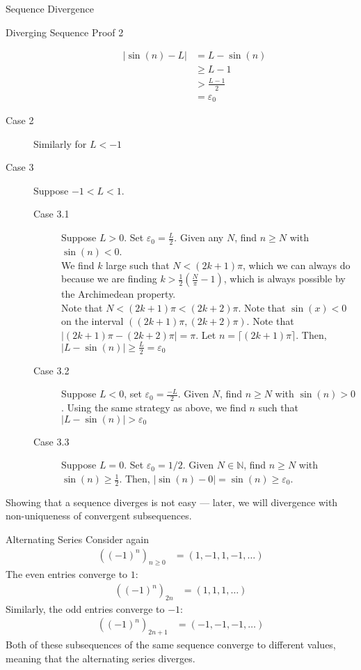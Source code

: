 \documentclass[8pt]{extarticle}
\newcommand{\N}{\mathbb{N}}
\begin{document}
\begin{problem}{Sequence Divergence}
\begin{problem}{Diverging Sequence Proof 2}
\begin{description}
          \begin{align*}
            |\sin(n)-L| &= L-\sin(n)\\
                        &\geq L-1\\
                        &> \frac{L-1}{2}\\
                        &= \varepsilon_0
          \end{align*}
        \item[Case 2] Similarly for $L < -1$
        \item[Case 3] Suppose $-1 < L < 1$.
          \begin{description}
            \item[Case 3.1] Suppose $L > 0$. Set $\varepsilon_0 = \frac{L}{2}$. Given any $N$, find $n \geq N$ with $\sin(n) < 0$. \\

              We find $k$ large such that $N < (2k+1)\pi$, which we can always do because we are finding $k > \frac{1}{2}\left(\frac{N}{\pi} - 1\right)$, which is always possible by the Archimedean property.\\

              Note that $N < (2k+1)\pi < (2k+2)\pi$. Note that $\sin(x) < 0$ on the interval $((2k+1)\pi,(2k+2)\pi)$. Note that $|(2k+1)\pi - (2k+2)\pi| = \pi$. Let $n = \lceil (2k+1)\pi\rceil$. Then, $|L-\sin(n)| \geq \frac{L}{2} = \varepsilon_0$
            \item[Case 3.2] Suppose $L < 0$, set $\varepsilon_0 = \frac{-L}{2}$. Given $N$, find $n \geq N$ with $\sin(n) > 0$. Using the same strategy as above, we find $n$ such that $|L - \sin(n)| > \varepsilon_0$
            \item[Case 3.3] Suppose $L = 0$. Set $\varepsilon_0 = 1/2$. Given $N\in\N$, find $n\geq N$ with $\sin(n) \geq \frac{1}{2}$. Then, $|\sin(n)-0| = \sin(n) \geq \varepsilon_0$.
          \end{description}
      \end{description}
    \end{problem}
    Showing that a sequence diverges is not easy --- later, we will divergence with non-uniqueness of convergent subsequences.
  \end{problem}
  \begin{problem}{Alternating Series}
    Consider again
    \begin{align*}
      \left((-1)^n\right)_{n\geq 0} &= (1,-1,1,-1,\dots)
    \end{align*}
    The even entries converge to $1$:
    \begin{align*}
      \left((-1)^n\right)_{2n} &= (1,1,1,\dots)
    \end{align*}
    Similarly, the odd entries converge to $-1$:
    \begin{align*}
      \left((-1)^n\right)_{2n+1} &= (-1,-1,-1,\dots)
    \end{align*}
    Both of these subsequences of the same sequence converge to different values, meaning that the alternating series diverges.
  \end{problem}
\end{document}
